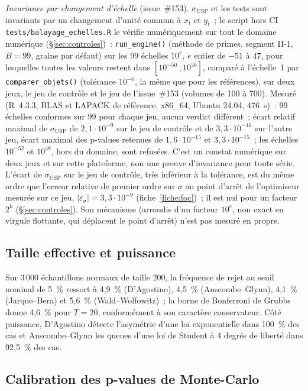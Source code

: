 \documentclass[a4paper,11pt]{article}
\newcommand{\code}[1]{\texttt{\small #1}}
\begin{document}
\emph{Invariance par changement d'échelle} (issue~\#153). $\sigma_{\mathrm{USP}}$ et les tests sont
invariants par un changement d'unité commun à $x_t$ et $y_t$~; le script hors CI
\code{tests/balayage\_echelles.R} le vérifie numériquement sur tout le domaine numérique
(§\ref{sec:controles})~: \code{run\_engine()} (méthode de primes, segment II-1, $B = 99$, graine
par défaut) sur les 99 échelles $10^{e}$, $e$ entier de $-51$ à $47$, pour lesquelles toutes les
valeurs restent dans $[10^{-50}\,;10^{50}]$, comparé à l'échelle~1 par \code{comparer\_objets()}
(tolérance $10^{-6}$, la même que pour les références), sur deux jeux, le jeu de contrôle et le jeu
de l'issue~\#153 (volumes de 100 à 700). Mesuré (R~4.3.3, BLAS et LAPACK de référence, x86\_64, Ubuntu 24.04, 476~s)~:
99 échelles conformes sur 99 pour chaque jeu, aucun verdict différent~; écart relatif maximal de
$\sigma_{\mathrm{USP}}$ de $2{,}1\cdot 10^{-9}$ sur le jeu de contrôle et de $3{,}3\cdot 10^{-16}$
sur l'autre jeu, écart maximal des p-values retenues de $1{,}6\cdot 10^{-15}$ et
$3{,}3\cdot 10^{-15}$~; les échelles $10^{-52}$ et $10^{48}$, hors du domaine, sont refusées.
C'est un constat numérique sur deux jeux et sur cette plateforme, non une preuve d'invariance
pour toute série. L'écart de $\sigma_{\mathrm{USP}}$ sur le jeu de contrôle, très inférieur à la
tolérance, est du même ordre que l'erreur relative de premier ordre sur $\sigma$ au point d'arrêt de
l'optimiseur mesurée sur ce jeu, $|\varepsilon_\sigma| = 3{,}3\cdot 10^{-9}$
(fiche~\ref{fiche:foc})~; il est nul pour un facteur $2^k$ (§\ref{sec:controles}). Son mécanisme
(arrondis d'un facteur $10^{e}$, non exact en virgule flottante, qui déplacent le point d'arrêt)
n'est pas mesuré en propre.

\subsection*{Taille effective et puissance}

Sur 3\,000 échantillons normaux de taille 200, la fréquence de rejet au seuil nominal de 5~\%
ressort à 4,9~\% (D'Agostino), 4,5~\% (Anscombe--Glynn), 4,1~\% (Jarque--Bera) et 5,6~\%
(Wald--Wolfowitz)~; la borne de Bonferroni de Grubbs donne 4,6~\% pour $T=20$, conformément à son
caractère conservateur. Côté puissance, D'Agostino détecte l'asymétrie d'une loi exponentielle
dans 100~\% des cas et Anscombe--Glynn les queues d'une loi de Student à 4 degrés de liberté
dans 92,5~\% des cas.

\subsection*{Calibration des p-values de Monte-Carlo}
\label{sec:calibration-mc}
\end{document}
